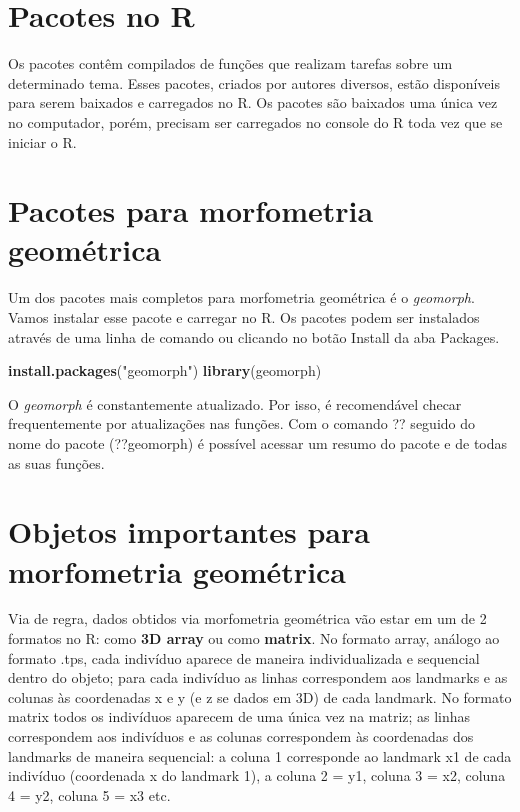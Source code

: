 \documentclass[
]{book}
\newenvironment{Shaded}{\begin{snugshade}}{\end{snugshade}}
\newcommand{\FunctionTok}[1]{\textcolor[rgb]{0.13,0.29,0.53}{\textbf{#1}}}
\newcommand{\NormalTok}[1]{#1}
\newcommand{\StringTok}[1]{\textcolor[rgb]{0.31,0.60,0.02}{#1}}
\begin{document}
\section{Pacotes no R}\label{pacotes-no-r}

Os pacotes contêm compilados de funções que realizam tarefas sobre um determinado tema.
Esses pacotes, criados por autores diversos, estão disponíveis para serem baixados e carregados no R.
Os pacotes são baixados uma única vez no computador, porém, precisam ser carregados no console do R toda vez que se iniciar o R.

\section{Pacotes para morfometria geométrica}\label{pacotes-para-morfometria-geomuxe9trica}

Um dos pacotes mais completos para morfometria geométrica é o \emph{geomorph}.
Vamos instalar esse pacote e carregar no R.
Os pacotes podem ser instalados através de uma linha de comando ou clicando no botão Install da aba Packages.

\begin{Shaded}
\begin{Highlighting}[]
\FunctionTok{install.packages}\NormalTok{(}\StringTok{"geomorph"}\NormalTok{)}
\FunctionTok{library}\NormalTok{(geomorph)}
\end{Highlighting}
\end{Shaded}

O \emph{geomorph} é constantemente atualizado.
Por isso, é recomendável checar frequentemente por atualizações nas funções.
Com o comando ??
seguido do nome do pacote (??geomorph) é possível acessar um resumo do pacote e de todas as suas funções.

\section{Objetos importantes para morfometria geométrica}\label{objetos-importantes-para-morfometria-geomuxe9trica}

Via de regra, dados obtidos via morfometria geométrica vão estar em um de 2 formatos no R: como \textbf{3D array} ou como \textbf{matrix}.
No formato array, análogo ao formato .tps, cada indivíduo aparece de maneira individualizada e sequencial dentro do objeto; para cada indivíduo as linhas correspondem aos landmarks e as colunas às coordenadas x e y (e z se dados em 3D) de cada landmark.
No formato matrix todos os indivíduos aparecem de uma única vez na matriz; as linhas correspondem aos indivíduos e as colunas correspondem às coordenadas dos landmarks de maneira sequencial: a coluna 1 corresponde ao landmark x1 de cada indivíduo (coordenada x do landmark 1), a coluna 2 = y1, coluna 3 = x2, coluna 4 = y2, coluna 5 = x3 etc.
\end{document}
